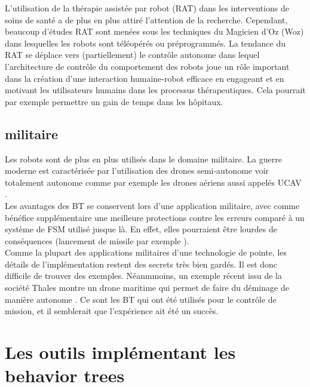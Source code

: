 \documentclass[titlepage]{article}
\begin{document}
		L’utilisation de la thérapie assistée par robot (RAT) dans les interventions de soins de santé a de plus en plus attiré l’attention de la recherche. Cependant, beaucoup d’études RAT sont menées sous les techniques du Magicien d’Oz (Woz) dans lesquelles les robots sont téléopérés ou préprogrammés. La tendance du RAT se déplace vers (partiellement) le contrôle autonome dans lequel l’architecture de contrôle du comportement des robots joue un rôle important dans la création d’une interaction humaine-robot efficace en engageant et en motivant les utilisateurs humains dans les processus thérapeutiques. \cite{rat} 
		Cela pourrait par exemple permettre un gain de temps dans les hôpitaux. 
	
		\subsection{militaire}
		Les robots sont de plus en plus utilisés dans le domaine militaire. La guerre moderne est caractérisée par l'utilisation des drones semi-autonome voir totalement autonome comme par exemple les drones aériens aussi appelés UCAV \cite{wikipedia_UCAV}.
		\\
		Les avantages des BT se conservent lors d'une application militaire, avec comme bénéfice supplémentaire une meilleure protections contre les erreurs comparé à un système de FSM utilisé jusque là. En effet, elles pourraient être lourdes de conséquences (lancement de missile par exemple \cite{figaro_2018}).
		\\
		Comme la plupart des applications militaires d'une technologie de pointe, les détails de l'implémentation restent des secrets très bien gardés. Il est donc difficile de trouver des exemples.
		Néanmmoins, un exemple récent issu de la société Thales montre un drone maritime qui permet de faire du déminage de manière autonome \cite{mer_et_marine_2018}. Ce sont les BT qui ont été utilisés pour le contrôle de mission, et il semblerait que l'expérience ait été un succès.

	\section{Les outils implémentant les behavior trees}
\end{document}
